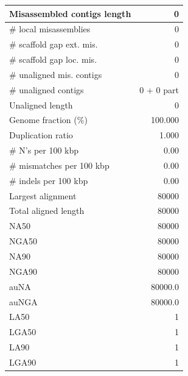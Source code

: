 \documentclass[12pt,a4paper]{article}
\begin{document}
\begin{table}[ht]
\begin{center}
\begin{tabular}{|l*{1}{|r}|}
Misassembled contigs length & 0 \\ \hline
\# local misassemblies & 0 \\ \hline
\# scaffold gap ext. mis. & 0 \\ \hline
\# scaffold gap loc. mis. & 0 \\ \hline
\# unaligned mis. contigs & 0 \\ \hline
\# unaligned contigs & 0 + 0 part \\ \hline
Unaligned length & 0 \\ \hline
Genome fraction (\%) & 100.000 \\ \hline
Duplication ratio & 1.000 \\ \hline
\# N's per 100 kbp & 0.00 \\ \hline
\# mismatches per 100 kbp & 0.00 \\ \hline
\# indels per 100 kbp & 0.00 \\ \hline
Largest alignment & 80000 \\ \hline
Total aligned length & 80000 \\ \hline
NA50 & 80000 \\ \hline
NGA50 & 80000 \\ \hline
NA90 & 80000 \\ \hline
NGA90 & 80000 \\ \hline
auNA & 80000.0 \\ \hline
auNGA & 80000.0 \\ \hline
LA50 & 1 \\ \hline
LGA50 & 1 \\ \hline
LA90 & 1 \\ \hline
LGA90 & 1 \\ \hline
\end{tabular}
\end{center}
\end{table}
\end{document}
